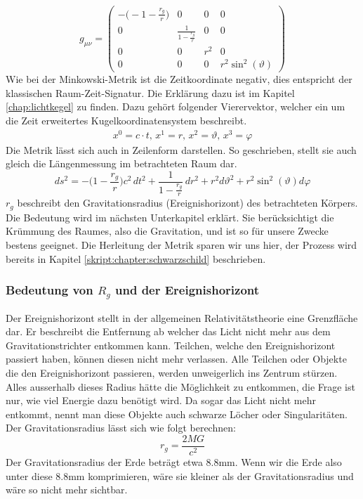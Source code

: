 \begin{refsection}
	\begin{equation}
	g_{\mu\nu}=
	\begin{pmatrix}
	-\biggl(-1- \displaystyle \frac{r_{g}}{r}\biggr) & 0 & 0 & 0 \\
	0 & \frac{\displaystyle 1}{\displaystyle1-\frac{r_{g}}{r}} & 0 & 0 \\
	0 & 0 & r^{2} & 0 \\
	0 & 0 & 0 & r^{2}\sin^{2}(\vartheta)
	\end{pmatrix}
	\end{equation}
	Wie bei der Minkowski-Metrik ist die Zeitkoordinate negativ, dies entspricht der klassischen Raum-Zeit-Signatur. Die Erklärung dazu ist im Kapitel \ref{chap:lichtkegel} zu finden.
	Dazu gehört folgender Vierervektor, welcher ein um die Zeit erweitertes Kugelkoordinatensystem beschreibt.
	\begin{align*}
	x^{0}=c \cdot t, \,
	x^{1}=r,\,
	x^{2}=\vartheta,\,
	x^{3}=\varphi
	\end{align*}
	Die Metrik lässt sich auch in Zeilenform darstellen. So geschrieben, stellt sie auch gleich die Längenmessung im betrachteten Raum dar.
	\begin{equation}
	ds^2
	=
	-\biggl(1-\frac{r_g}r\biggr)c^2\,dt^2
	+
	\frac{1}{\displaystyle 1-\frac{r_g}r}\,dr^2 
	+
	r^2d\vartheta^2 
	+ 
	r^2\sin^2(\vartheta)d\varphi
	\end{equation}
	$r_g$ beschreibt den Gravitationsradius (Ereignishorizont) des betrachteten Körpers. Die Bedeutung wird im nächsten Unterkapitel erklärt.
	Sie berücksichtigt die Krümmung des Raumes, also die Gravitation, und ist so für unsere Zwecke bestens geeignet. 
	Die Herleitung der Metrik sparen wir uns hier, der Prozess wird bereits in Kapitel \ref{skript:chapter:schwarzschild} beschrieben.
	
	\subsubsection{Bedeutung von $R_{g}$ und der Ereignishorizont}
	
	Der Ereignishorizont stellt in der allgemeinen Relativitätstheorie eine Grenzfläche dar. Er beschreibt die Entfernung ab welcher das Licht nicht mehr aus dem Gravitationstrichter entkommen kann. Teilchen, welche den Ereignishorizont passiert haben, können diesen nicht mehr verlassen. Alle Teilchen oder Objekte die den Ereignishorizont passieren, werden unweigerlich ins Zentrum stürzen. Alles ausserhalb dieses Radius hätte die Möglichkeit zu entkommen, die Frage ist nur, wie viel Energie dazu benötigt wird. Da sogar das Licht nicht mehr entkommt, nennt man diese Objekte auch schwarze Löcher oder Singularitäten.
	Der Gravitationsradius lässt sich wie folgt berechnen:
	\begin{equation} \label{Gravitationsradius}
	r_{g}= \frac{2MG}{c^2}
	\end{equation}
	Der Gravitationsradius der Erde beträgt etwa 8.8mm. Wenn wir die Erde also unter diese 8.8mm komprimieren, wäre sie kleiner als der Gravitationsradius und wäre so nicht mehr sichtbar.
	

\end{refsection}
